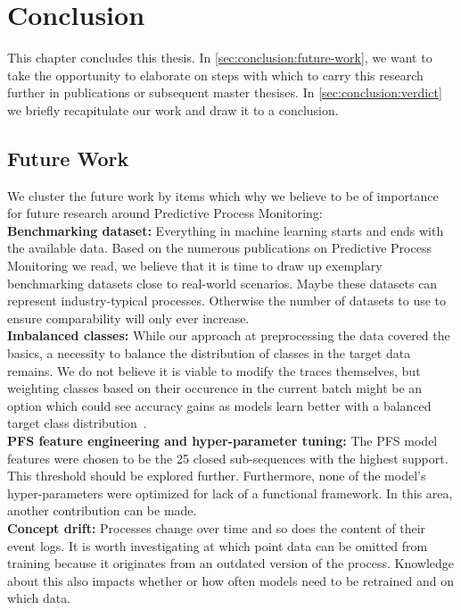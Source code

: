 \chapter{Conclusion} \label{chap:conclusion}
This chapter concludes this thesis. In \autoref{sec:conclusion:future-work}, we want to take the opportunity to elaborate on steps with which to carry this research further in publications or subsequent master thesises. In \autoref{sec:conclusion:verdict} we briefly recapitulate our work and draw it to a conclusion.

\section{Future Work} \label{sec:conclusion:future-work}
We cluster the future work by items which why we believe to be of importance for future research around Predictive Process Monitoring:\\

\noindent\textbf{Benchmarking dataset:} Everything in machine learning starts and ends with the available data. Based on the numerous publications on Predictive Process Monitoring we read, we believe that it is time to draw up exemplary benchmarking datasets close to real-world scenarios. Maybe these datasets can represent industry-typical processes. Otherwise the number of datasets to use to ensure comparability will only ever increase.\\

\noindent\textbf{Imbalanced classes:} While our approach at preprocessing the data covered the basics, a necessity to balance the distribution of classes in the target data remains. We do not believe it is viable to modify the traces themselves, but weighting classes based on their occurence in the current batch might be an option which could see accuracy gains as models learn better with a balanced target class distribution~\cite{web:stackoverflow-keras-class-weights}.\\

\noindent\textbf{PFS feature engineering and hyper-parameter tuning:} The PFS model features  were chosen to be the 25 closed sub-sequences with the highest support. This threshold should be explored further. Furthermore, none of the model's hyper-parameters were optimized for lack of a functional framework. In this area, another contribution can be made.\\

\noindent\textbf{Concept drift:} Processes change over time and so does the content of their event logs. It is worth investigating at which point data can be omitted from training because it originates from an outdated version of the process. Knowledge about this also impacts whether or how often models need to be retrained and on which data.\\

